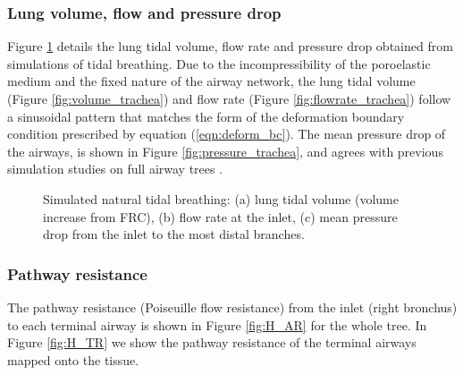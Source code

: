 \subsubsection{Lung volume, flow and pressure drop}
Figure \ref{fig:trachea} details the lung tidal volume, flow rate and pressure drop obtained from simulations of tidal breathing. Due to the incompressibility of the poroelastic medium and the fixed nature of the airway network, the lung tidal volume (Figure \ref{fig:volume_trachea}) and flow rate (Figure \ref{fig:flowrate_trachea}) follow a sinusoidal pattern that matches the form of the deformation boundary condition prescribed by equation (\ref{eqn:deform_bc}). The mean pressure drop of the airways, is shown in Figure \ref{fig:pressure_trachea}, and agrees with previous simulation studies on full airway trees \cite{ismail2013coupled,Swan2012}.
%
\begin{figure}[h]
  \centering
\caption{Simulated natural tidal breathing: (a) lung tidal volume (volume increase from FRC), (b) flow rate at the inlet, (c) mean pressure drop from the inlet to the most distal branches.}
\label{fig:trachea}
\end{figure}
%
\subsubsection{Pathway resistance}
The pathway resistance (Poiseuille flow resistance) from the inlet (right bronchus) to each terminal airway is shown in Figure \ref{fig:H_AR} for the whole tree. In Figure \ref{fig:H_TR} we show the pathway resistance of the terminal airways mapped onto the tissue.
